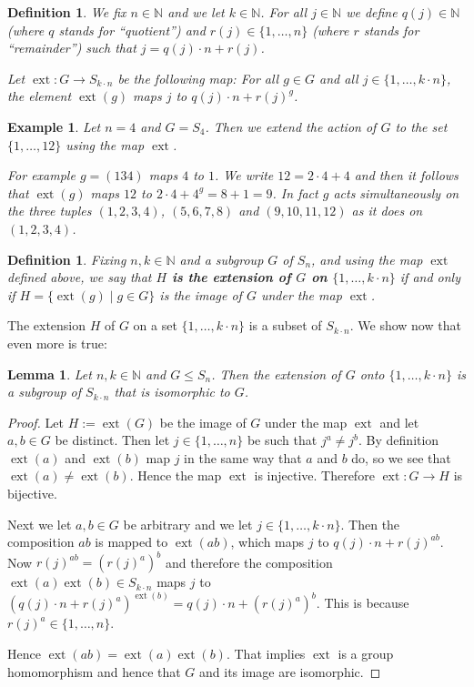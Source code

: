 \documentclass[preprint,12pt]{elsarticle}
\newtheorem{lem}[theorem]{Lemma}
\newtheorem{defi}[theorem]{Definition}
\newtheorem{ex}[theorem]{Example}
\newcommand{\SX}[1]{\ensuremath{S_{#1}}\xspace}
\newcommand{\N}{\mathbb{N}}
\newcommand{\ext}{\operatorname{ext}}
\begin{document}
\begin{defi}
We fix $n \in \N$ and we let $k \in \N$. For all $j \in \N$ we define $q(j) \in
\N$ (where $q$ stands for ``quotient'') and $r(j) \in \{1,\dots,n\}$ (where $r$ stands for ``remainder'') such that $j=q(j) \cdot n+r(j)$.


Let $\ext : G \rightarrow \SX{k \cdot n}$ be the following map:
For all $g \in G$ and all $j \in \{1,\dots,k \cdot n\}$, the element
$\ext(g)$ maps $j$ to $q(j) \cdot n+r(j)^g$.
\end{defi}


\begin{ex}
Let $n=4$ and $G=\SX{4}$. Then we extend the action of $G$ to the set
$\{1,\dots,12\}$ using the map $\ext$.

For example $g=(134)$ maps $4$ to $1$.
We write $12=2 \cdot 4+4$ and then it follows that
$\ext(g)$ maps $12$ to $2 \cdot 4 +4^g=8+1=9$.
In fact $g$ acts simultaneously on the three tuples $(1,2,3,4)$, $(5,6,7,8)$
and $(9,10,11,12)$ as it does on $(1,2,3,4)$.
\end{ex}

\begin{defi}
Fixing $n,k \in \N$ and a subgroup $G$ of $\SX{n}$, and using the map $\ext$
defined above, we say that \textbf{$H$ is the extension of $G$ on
  $\{1,\dots,k\cdot n\}$}
if and only if $H=\{\ext(g) \mid g \in G\}$ is the image of $G$
under the map $\ext$.
\end{defi}

The extension $H$ of $G$ on a set $\{1,\dots,k \cdot n\}$
is a subset of $\SX{k \cdot n}$. We show now that even more is true:

\begin{lem}\label{ext}
Let $n,k \in \N$ and $G \le \SX{n}$. Then the extension of $G$ onto $\{1,\dots,k \cdot n\}$ is a subgroup of $\SX{k \cdot n}$ that is isomorphic to $G$.
\end{lem}

\begin{proof} Let $H:=\ext(G)$ be the image of $G$ under the map $\ext$ and let
$a,b \in G$ be distinct. Then let $j \in \{1,\dots,n\}$ be such that $j^a \neq
j^b$.
By definition $\ext(a)$ and $\ext(b)$ map $j$ in the same way that $a$ and $b$
do, so we see that $\ext(a) \neq \ext(b)$. Hence the map $\ext$ is injective.
Therefore $\ext:G \rightarrow H$ is bijective.

Next we let $a,b \in G$ be arbitrary and we let $j \in \{1,\dots,k \cdot n\}$.
Then the composition $ab$ is mapped to $\ext(ab)$, which maps $j$ to $q(j) \cdot
n+r(j)^{ab}$. Now $r(j)^{ab}=(r(j)^a)^b$ and therefore the composition
$\ext(a)\ext(b) \in \SX{k \cdot n}$ maps $j$ to $(q(j) \cdot
n+r(j)^a)^{\ext(b)}=q(j) \cdot n + (r(j)^a)^b$. This is because $r(j)^a \in
\{1,\dots,n\}$.

Hence $\ext(ab)=\ext(a)\ext(b)$. That implies $\ext$ is a group homomorphism
and hence that $G$ and its image are isomorphic.
\end{proof}
\end{document}
